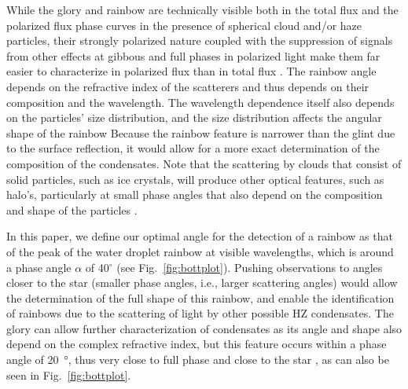 \documentclass[
    usenatbib,
]{mnras}
\begin{document}
%
While the glory and rainbow are technically visible both in the total flux
and the polarized flux phase curves
in the presence of spherical cloud and/or haze particles, their strongly polarized nature coupled with the suppression of signals from other effects at gibbous and full phases in polarized light make them far easier to characterize in polarized flux than in total flux \citep{karalidi2011, stam2008, treesandstam2019}.
%
The rainbow angle depends on the refractive index of the scatterers and thus depends on their composition and the wavelength. 
The wavelength dependence itself also depends on the particles' size distribution, and the size distribution affects the angular shape of the rainbow \citep{karalidi2011}
%
Because the rainbow feature is narrower than the glint due to the surface reflection, it would 
allow for a more exact determination of the composition of the condensates.
%
Note that the scattering by clouds that consist of solid particles, 
such as ice crystals, will produce other optical features, such as halo's, particularly at small phase angles \citep{2022JQSRT.29008313M,Bailey2007,hansentravis1974, karalidi2012rainbow} that also depend on the composition and shape of the particles \citep[see e.g.][for simulations of halo's due to carbon dioxide ice crystals]{2023GeoRL..5003457D}.
%

In this paper, we define our optimal angle for the detection of a rainbow as that of the peak of the water droplet rainbow at visible wavelengths, which is around a phase angle $\alpha$ of 40$^\circ$ (see Fig.~\ref{fig:bottplot}).
%
Pushing observations to angles closer to the star (smaller phase angles, i.e., larger scattering angles) would allow the determination of the full shape of this rainbow, and enable the identification of rainbows due to the scattering of light by other possible HZ condensates.
%
The glory 
can allow further characterization of condensates as its angle and shape also depend on the complex refractive index, but this feature occurs within a phase angle of \qty{20}{\degree}, thus very close to full phase and close to the star \citep{hansentravis1974}, as can also be seen in Fig.~\ref{fig:bottplot}.
%
\end{document}
